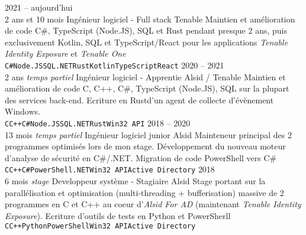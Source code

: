 \documentclass[8pt]{developercv} %
\begin{document}
\begin{entrylist}
	\entry
		{2021 -- aujourd'hui\\\footnotesize{2 ans et 10 mois}}
		{Ingénieur logiciel - Full stack}
		{Tenable}
		{
			Maintien et amélioration de code C\#, TypeScript (Node.JS), SQL et Rust pendant presque 2 ans, puis exclusivement Kotlin,
			SQL et TypeScript/React pour les applications \emph{Tenable Identity Exposure} et \emph{Tenable One}\\
			\texttt{C\#}\slashsep\texttt{Node.JS}\slashsep\texttt{SQL}\slashsep\texttt{.NET}\slashsep\texttt{Rust}\slashsep\texttt{Kotlin}\slashsep\texttt{TypeScript}\slashsep\texttt{React}
		}
	\entry
		{2020 -- 2021\\\footnotesize{2 ans \emph{temps partiel}}}
		{Ingénieur logiciel - Apprentie}
		{Alsid / Tenable}
		{
			Maintien et amélioration de code C, C++, C\#, TypeScript (Node.JS), SQL sur la plupart des services back-end. Ecriture en Rust\footnotemark[1] d'un agent de collecte d'évènement Windows.\\
			\texttt{C}\slashsep\texttt{C++}\slashsep\texttt{C\#}\slashsep\texttt{Node.JS}\slashsep\texttt{SQL}\slashsep\texttt{.NET}\slashsep\texttt{Rust}\slashsep\texttt{Win32 API}
		}
	\entry
		{2018 -- 2020\\\footnotesize{13 mois \emph{temps partiel}}}
		{Ingénieur logiciel junior}
		{Alsid}
		{
			Mainteneur principal des 2 programmes optimisés lors de mon stage. Développement du nouveau moteur d'analyse de sécurité en C\#/.NET. Migration de code PowerShell vers C\#\\
			\texttt{C}\slashsep\texttt{C++}\slashsep\texttt{C\#}\slashsep\texttt{PowerShell}\slashsep\texttt{.NET}\slashsep\texttt{Win32 API}\slashsep\texttt{Active Directory}
		}
	\entry
		{2018\\\footnotesize{6 mois \emph{stage}}}
		{Developpeur système  - Stagiaire}
		{Alsid}
		{
			Stage portant sur la parallélisation et optimisation (multi-threading + bufferisation) massive de 2 programmes en C et C++ au coeur d'\emph{Alsid For AD} (maintenant \emph{Tenable Identity Exposure}).
			Ecriture d'outils de tests en Python et PowerSherll\\
			\texttt{C}\slashsep\texttt{C++}\slashsep\texttt{Python}\slashsep\texttt{PowerShell}\slashsep\texttt{Win32 API}\slashsep\texttt{Active Directory}
		}
\end{entrylist}

\vfill %
\end{document}

